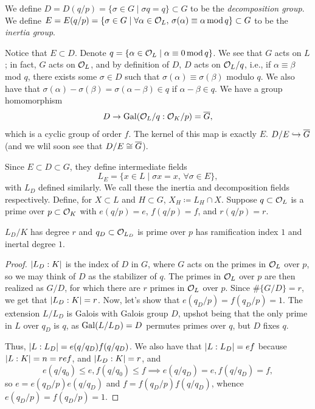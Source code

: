 \begin{definition} \label{defn:decomposition_inertia_group}
    We define $D = D(q/p) = \{\sigma \in G \mid \sigma q = q\} \subset G$ to be the \textit{decomposition group}. We define $E = E(q/p) = \{\sigma \in G \mid \forall \alpha \in \mathcal O_L, \, \sigma(\alpha) \equiv \alpha \operatorname{mod} q\} \subset G$ to be the \textit{inertia group}.
\end{definition}
Notice that $E \subset D$. Denote $q = \{\alpha \in \mathcal O_L \mid \alpha \equiv 0 \operatorname{mod} q\}$. We see that $G$ acts on $L$; in fact, $G$ acts on $\mathcal O_L$, and by definition of $D$, $D$ acts on $\mathcal O_L / q$, i.e., if $\alpha \equiv \beta$ mod $q$, there exists some $\sigma \in D$ such that $\sigma(\alpha) \equiv \sigma(\beta)$ modulo $q$. We also have that $\sigma(\alpha) - \sigma(\beta) = \sigma(\alpha - \beta) \in q$ if $\alpha - \beta \in q$. We have a group homomorphism
\[ D \to \operatorname{Gal}(\mathcal O_L/q : \mathcal O_K/p) = \overline G, \]
which is a cyclic group of order $f$. The kernel of this map is exactly $E$. $D/E \hookrightarrow \overline G$ (and we wlil soon see that $D/E \cong \overline G$).

Since $E \subset D \subset G$, they define intermediate fields
\[ L_E = \{x \in L \mid \sigma x = x, \, \forall \sigma \in E\}, \]
with $L_D$ defined similarly. We call these the inertia and decomposition fields respectively. Define, for $X \subset L$ and $H \subset G$, $X_H \coloneq L_H \cap X$. Suppose $q \subset \mathcal O_L$ is a prime over $p \subset \mathcal O_K$ with $e(q/p) = e$, $f(q/p) = f$, and $r(q/p) = r$.

\begin{theorem} \label{thm:degrees_of_decomposition_inertial_field}
    $L_D/K$ has degree $r$ and $q_D \subset \mathcal O_{L_D}$ is prime over $p$ has ramification index $1$ and inertal degree $1$.
\end{theorem}
\begin{proof}
    $\left\lvert L_D : K \right\rvert$ is the index of $D$ in $G$, where $G$ acts on the primes in $\mathcal O_L$ over $p$, so we may think of $D$ as the stabilizer of $q$. The primes in $\mathcal O_L$ over $p$ are then realized as $G/D$, for which there are $r$ primes in $\mathcal O_L$ over $p$. Since $\#\{G/D\} = r$, we get that $\left\lvert L_D : K \right\rvert = r$. Now, let's show that $e(q_D / p) = f(q_D / p) = 1$. The extension $L / L_D$ is Galois with Galois group $D$, upshot being that the only prime in $L$ over $q_D$ is $q$, as $\operatorname{Gal}(L/L_D) = D$ permutes primes over $q$, but $D$ fixes $q$.

    Thus, $\left\lvert L:L_D \right\rvert = e(q/q_D) f(q/q_D)$. We also have that $\left\lvert L:L_D \right\rvert = ef$ because $\left\lvert L:K \right\rvert = n = ref$, and $\left\lvert L_D:K \right\rvert = r$, and
    \[ e(q / q_0) \leq e, f(q / q_0) \leq f \implies e(q / q_D) = e, f(q / q_D) = f, \]
    so $e = e(q_D/p) e(q/q_D)$ and $f = f(q_D/p) f(q/q_D)$, whence $e(q_D/p) = f(q_D/p) = 1$.
\end{proof}

